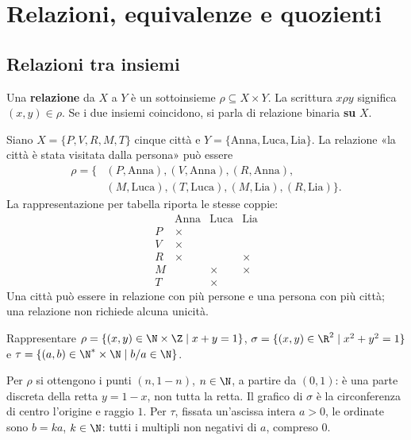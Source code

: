 \chapter{Relazioni, equivalenze e quozienti}

\section{Relazioni tra insiemi}
\begin{definizione}
Una \textbf{relazione} da $X$ a $Y$ è un sottoinsieme $\rho\subseteq X\times Y$. La scrittura $x\rho y$ significa $(x,y)\in\rho$. Se i due insiemi coincidono, si parla di relazione binaria \textbf{su} $X$.
\end{definizione}

\begin{esempio}
Siano $X=\{P,V,R,M,T\}$ cinque città e $Y=\{\text{Anna},\text{Luca},\text{Lia}\}$. La relazione «la città è stata visitata dalla persona» può essere
\[
\begin{split}
\rho=\{&(P,\text{Anna}),(V,\text{Anna}),(R,\text{Anna}),\\
&(M,\text{Luca}),(T,\text{Luca}),(M,\text{Lia}),(R,\text{Lia})\}.
\end{split}
\]
La rappresentazione per tabella riporta le stesse coppie:
\[
\begin{array}{c|ccc}
&\text{Anna}&\text{Luca}&\text{Lia}\\\hline
P&\times&&\\V&\times&&\\R&\times&&\times\\M&&\times&\times\\T&&\times&
\end{array}
\]
Una città può essere in relazione con più persone e una persona con più città; una relazione non richiede alcuna unicità.
\end{esempio}

\begin{esercizio}
Rappresentare $\rho=\{(x,y)\in\N\times\Z\mid x+y=1\}$, $\sigma=\{(x,y)\in\R^2\mid x^2+y^2=1\}$ e $\tau=\{(a,b)\in\N^*\times\N\mid b/a\in\N\}$.
\end{esercizio}
\begin{svolgimento}
Per $\rho$ si ottengono i punti $(n,1-n)$, $n\in\N$, a partire da $(0,1)$: è una parte discreta della retta $y=1-x$, non tutta la retta. Il grafico di $\sigma$ è la circonferenza di centro l'origine e raggio $1$. Per $\tau$, fissata un'ascissa intera $a>0$, le ordinate sono $b=ka$, $k\in\N$: tutti i multipli non negativi di $a$, compreso $0$.
\end{svolgimento}

